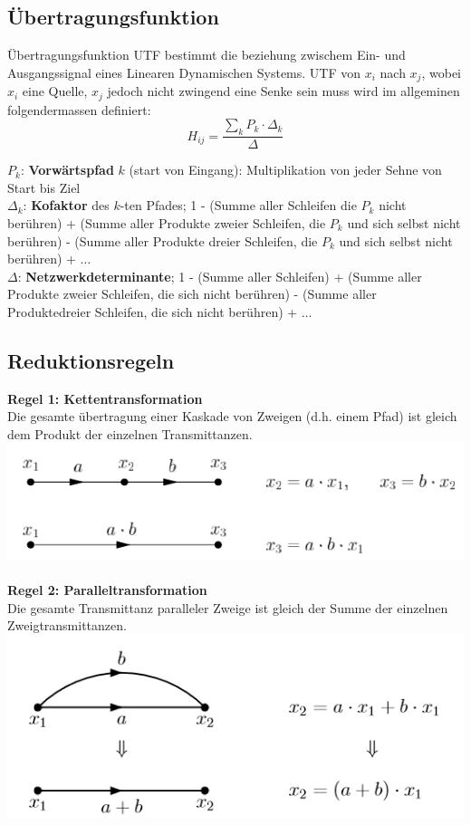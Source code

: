 \subsection{Übertragungsfunktion}
Übertragungsfunktion UTF bestimmt die beziehung zwischem Ein- und Ausgangssignal eines Linearen Dynamischen Systems. UTF von $x_i$ nach $x_j$, wobei $x_i$ eine Quelle, $x_j$ jedoch nicht zwingend eine Senke sein muss wird im allgeminen folgendermassen definiert:
\[
H_{ij} = \frac{\sum_{k} P_{k}\cdot \Delta_k}{\Delta}
\]

\noindent$P_k$: \textbf{Vorwärtspfad} $k$ (start von Eingang): Multiplikation von jeder Sehne von Start bis Ziel\\
$\Delta_k$: \textbf{Kofaktor} des $k$-ten Pfades; 1 - (Summe aller Schleifen die $P_k$ nicht berühren) + (Summe aller Produkte zweier Schleifen, die $P_k$ und sich selbst nicht berühren) - (Summe aller Produkte dreier Schleifen, die $P_k$ und sich selbst nicht berühren) + $\dots$\\
$\Delta$: \textbf{Netzwerkdeterminante}; 1 - (Summe aller Schleifen) + (Summe aller Produkte zweier Schleifen, die sich nicht berühren) - (Summe aller Produktedreier Schleifen, die sich nicht berühren) + $\dots$\\


\subsection{Reduktionsregeln}
\noindent\textbf{Regel 1: Kettentransformation}\\
 Die gesamte übertragung einer Kaskade von Zweigen (d.h. einem Pfad) ist gleich dem Produkt der einzelnen Transmittanzen.\\
\includegraphics[width=\columnwidth]{Images/sfd_r1}~\\

\noindent\textbf{Regel 2: Paralleltransformation}\\
 Die gesamte Transmittanz paralleler Zweige ist gleich der Summe der einzelnen Zweigtransmittanzen.\\
\includegraphics[width=\columnwidth]{Images/sfd_r2}~\\

